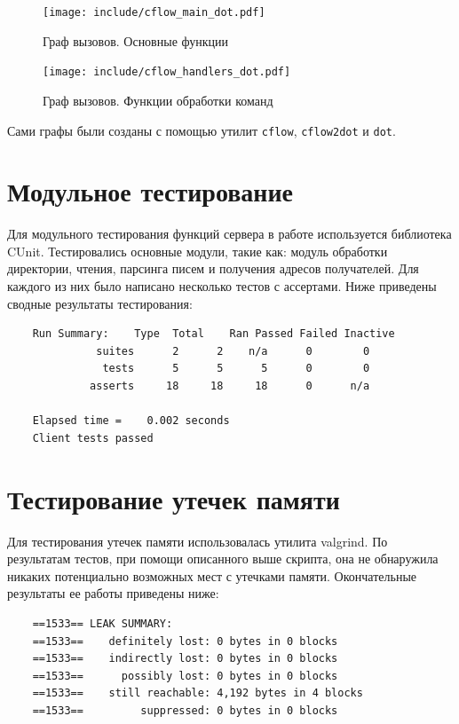 \documentclass[a4paper,12pt]{report}
\begin{document}
\begin{figure}[h]
\texttt{[image: include/cflow\_main\_dot.pdf]}
\caption{Граф вызовов. Основные функции}
\label{fig:cflow1}
\end{figure}

\begin{figure}
\centering
\texttt{[image: include/cflow\_handlers\_dot.pdf]}
\caption{Граф вызовов. Функции обработки команд}
\label{fig:cflow2}
\end{figure}

Сами графы были созданы с помощью утилит \texttt{cflow}, \texttt{cflow2dot} и \texttt{dot}.


\section{Модульное тестирование}

Для модульного тестирования функций сервера в работе используется библиотека CUnit. Тестировались основные модули, такие как: модуль обработки директории, чтения, парсинга писем и получения адресов получателей. Для каждого из них было написано несколько тестов с ассертами. Ниже приведены сводные результаты тестирования:
\begin{verbatim}
    Run Summary:    Type  Total    Ran Passed Failed Inactive
              suites      2      2    n/a      0        0
               tests      5      5      5      0        0
             asserts     18     18     18      0      n/a

    Elapsed time =    0.002 seconds
    Client tests passed
\end{verbatim}



\section{Тестирование утечек памяти}

Для тестирования утечек памяти использовалась утилита valgrind. По результатам тестов, при помощи описанного выше скрипта, она не обнаружила никаких потенциально возможных мест с утечками памяти. Окончательные результаты ее работы приведены ниже:
\begin{verbatim}
    ==1533== LEAK SUMMARY:
    ==1533==    definitely lost: 0 bytes in 0 blocks
    ==1533==    indirectly lost: 0 bytes in 0 blocks
    ==1533==      possibly lost: 0 bytes in 0 blocks
    ==1533==    still reachable: 4,192 bytes in 4 blocks
    ==1533==         suppressed: 0 bytes in 0 blocks

\end{verbatim}
\end{document}
